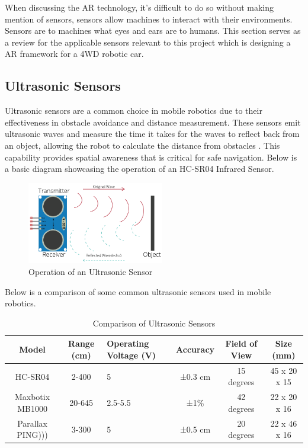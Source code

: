 When discussing the AR technology, it's difficult to do so without making mention of sensors, sensors allow machines to interact with their environments. Sensors are to machines what eyes and ears are to humans. This section serves as a review for the applicable sensors relevant to this project which is designing a AR framework for a 4WD robotic car.

\subsection{Ultrasonic Sensors} 
Ultrasonic sensors are a common choice in mobile robotics due to their effectiveness in obstacle avoidance and distance measurement. These sensors emit ultrasonic waves and measure the time it takes for the waves to reflect back from an object, allowing the robot to calculate the distance from obstacles \cite{maupin2023ultrasonic}. This capability provides spatial awareness that is critical for safe navigation. Below is a basic diagram showcasing the operation of an HC-SR04 Infrared Sensor.

\begin{figure}[ht]
    \centering
    \includegraphics[width=0.53\textwidth]{ch2/figs/ultrasonic_sensor.png} %
    \caption{Operation of an Ultrasonic Sensor {\cite{randomnerd2021ultrasonic}}}
    \label{fig:ultrasonic_sensor}
\end{figure}

\noindent
Below is a comparison of some common ultrasonic sensors used in mobile robotics.

\begin{table}[ht]
\centering
\caption{Comparison of Ultrasonic Sensors}
\begin{tabularx}{\textwidth}{|c|c|X|c|c|c|}
\hline
\textbf{Model} & \textbf{Range (cm)} & \textbf{Operating Voltage (V)} & \textbf{Accuracy} & \textbf{Field of View} & \textbf{Size (mm)} \\ \hline
HC-SR04 & 2-400 & 5 & ±0.3 cm & 15 degrees & 45 x 20 x 15 \\ \hline
Maxbotix MB1000 & 20-645 & 2.5-5.5 & ±1\% & 42 degrees & 22 x 20 x 16 \\ \hline
Parallax PING))) & 3-300 & 5 & ±0.5 cm & 20 degrees & 22 x 46 x 16 \\ \hline
\end{tabularx}
\label{tab:ultrasonic_comparison}
\end{table}

